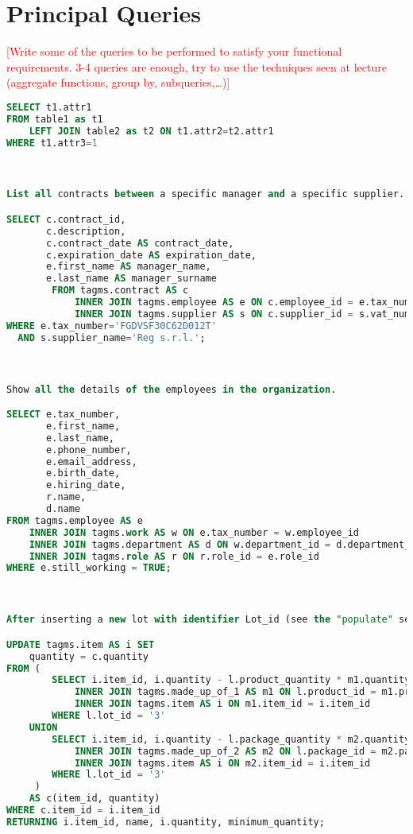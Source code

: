 \section{Principal Queries}
\textcolor{red}{[Write some of the queries to be performed to satisfy your functional requirements. 3-4 queries are enough, try to use the techniques seen at lecture (aggregate functions, group by, subqueries,…)]}

\begin{lstlisting}[language=SQL,
keywordstyle=\color{blue},
stringstyle=\color{mauve},
showstringspaces=false,
basicstyle=\ttfamily\footnotesize]
SELECT t1.attr1
FROM table1 as t1
    LEFT JOIN table2 as t2 ON t1.attr2=t2.attr1 
WHERE t1.attr3=1



List all contracts between a specific manager and a specific supplier.

SELECT c.contract_id,
       c.description,
       c.contract_date AS contract_date,
       c.expiration_date AS expiration_date,
       e.first_name AS manager_name,
       e.last_name AS manager_surname
		FROM tagms.contract AS c
		    INNER JOIN tagms.employee AS e ON c.employee_id = e.tax_number
		    INNER JOIN tagms.supplier AS s ON c.supplier_id = s.vat_number
WHERE e.tax_number='FGDVSF30C62D012T'
  AND s.supplier_name='Reg s.r.l.';



Show all the details of the employees in the organization.

SELECT e.tax_number,
       e.first_name,
       e.last_name,
       e.phone_number,
       e.email_address,
       e.birth_date,
       e.hiring_date,
       r.name,
       d.name
FROM tagms.employee AS e
    INNER JOIN tagms.work AS w ON e.tax_number = w.employee_id
    INNER JOIN tagms.department AS d ON w.department_id = d.department_id
    INNER JOIN tagms.role AS r ON r.role_id = e.role_id
WHERE e.still_working = TRUE;



After inserting a new lot with identifier Lot_id (see the "populate" section), decrease the quantity of the items involved in the production of a lot.

UPDATE tagms.item AS i SET
    quantity = c.quantity
FROM (
        SELECT i.item_id, i.quantity - l.product_quantity * m1.quantity AS quantity FROM tagms.lot AS l
            INNER JOIN tagms.made_up_of_1 AS m1 ON l.product_id = m1.product_id
            INNER JOIN tagms.item AS i ON m1.item_id = i.item_id
        WHERE l.lot_id = '3'
    UNION
        SELECT i.item_id, i.quantity - l.package_quantity * m2.quantity AS quantity FROM tagms.lot AS l
            INNER JOIN tagms.made_up_of_2 AS m2 ON l.package_id = m2.package_id
            INNER JOIN tagms.item AS i ON m2.item_id = i.item_id
        WHERE l.lot_id = '3'
     )
    AS c(item_id, quantity)
WHERE c.item_id = i.item_id
RETURNING i.item_id, name, i.quantity, minimum_quantity;




\end{lstlisting}
